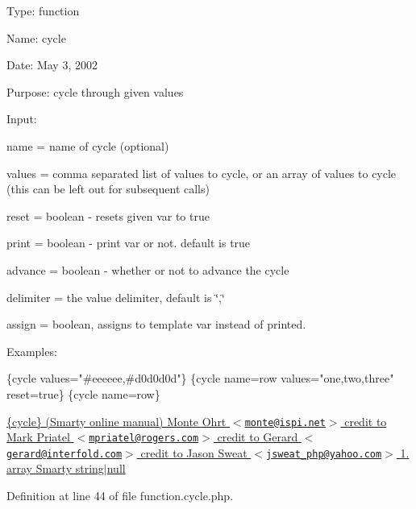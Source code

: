 \-Type\-: function\par
 \-Name\-: cycle\par
 \-Date\-: \-May 3, 2002\par
 \-Purpose\-: cycle through given values\par
 \-Input\-:
\begin{DoxyItemize}
\item name = name of cycle (optional)
\item values = comma separated list of values to cycle, or an array of values to cycle (this can be left out for subsequent calls)
\item reset = boolean -\/ resets given var to true
\item print = boolean -\/ print var or not. default is true
\item advance = boolean -\/ whether or not to advance the cycle
\item delimiter = the value delimiter, default is \char`\"{},\char`\"{}
\item assign = boolean, assigns to template var instead of printed.
\end{DoxyItemize}

\-Examples\-:\par
 
\begin{DoxyPre}
 \{cycle values="#eeeeee,#d0d0d0d"\}
 \{cycle name=row values="one,two,three" reset=true\}
 \{cycle name=row\}
 \end{DoxyPre}
 \hyperlink{}{\{cycle\} (\-Smarty online manual)  \-Monte \-Ohrt $<$\href{mailto:monte@ispi.net}{\tt monte@ispi.\-net}$>$  credit to \-Mark \-Priatel $<$\href{mailto:mpriatel@rogers.com}{\tt mpriatel@rogers.\-com}$>$  credit to \-Gerard $<$\href{mailto:gerard@interfold.com}{\tt gerard@interfold.\-com}$>$  credit to \-Jason \-Sweat $<$\href{mailto:jsweat_php@yahoo.com}{\tt jsweat\-\_\-php@yahoo.\-com}$>$  1.  array  \-Smarty  string$|$null }

\-Definition at line 44 of file function.\-cycle.\-php.


